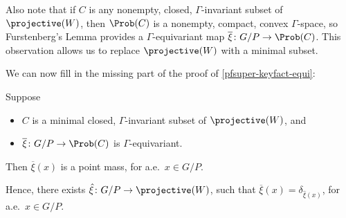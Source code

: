 Also note that if $C$ is any nonempty, closed, $\Gamma$-invariant subset of $\projective(W)$, then $\Prob(C)$ is a nonempty, compact, convex $\Gamma$-space, so Furstenberg's Lemma  provides a $\Gamma$-equivariant map $\overline{\xi} \colon G/P \to \Prob(C)$. This observation allows us to replace $\projective(W)$ with a minimal subset.

We can now fill in the missing part of the proof of \cref{pfsuper-keyfact-equi}:

\begin{cor} \label{pfsuper-xi(x)ptmass}
Suppose 
\noprelistbreak
	\begin{itemize}
	\item $C$ is a minimal closed, $\Gamma$-invariant subset of\/ $\projective(W)$,
	and
	\item $\overline{\xi} \colon G/P \to \Prob(C)$ is $\Gamma$-equivariant.
	\end{itemize}
Then $\overline{\xi}(x)$ is a point mass, for a.e.\ $x \in G/P$.

Hence, there exists $\hat\xi \colon G/P \to \projective(W)$, such that $\overline{\xi}(x) = \delta_{\hat\xi(x)}$, for a.e.\ $x \in G/P$.
\end{cor}

